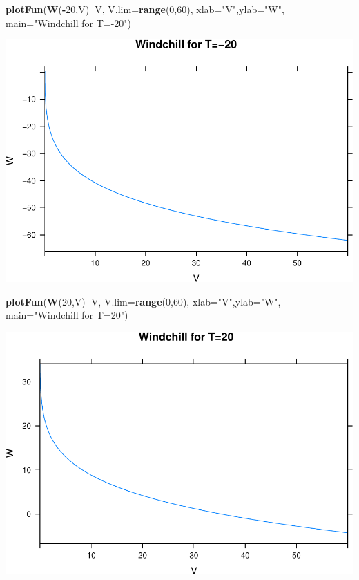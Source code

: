 \documentclass[
]{book}
\newenvironment{Shaded}{\begin{snugshade}}{\end{snugshade}}
\newcommand{\DataTypeTok}[1]{\textcolor[rgb]{0.13,0.29,0.53}{#1}}
\newcommand{\DecValTok}[1]{\textcolor[rgb]{0.00,0.00,0.81}{#1}}
\newcommand{\KeywordTok}[1]{\textcolor[rgb]{0.13,0.29,0.53}{\textbf{#1}}}
\newcommand{\NormalTok}[1]{#1}
\newcommand{\OperatorTok}[1]{\textcolor[rgb]{0.81,0.36,0.00}{\textbf{#1}}}
\newcommand{\StringTok}[1]{\textcolor[rgb]{0.31,0.60,0.02}{#1}}
\begin{document}
\begin{Shaded}
\begin{Highlighting}[]
\KeywordTok{plotFun}\NormalTok{(}\KeywordTok{W}\NormalTok{(}\OperatorTok{-}\DecValTok{20}\NormalTok{,V)}\OperatorTok{~}\NormalTok{V, }\DataTypeTok{V.lim=}\KeywordTok{range}\NormalTok{(}\DecValTok{0}\NormalTok{,}\DecValTok{60}\NormalTok{), }\DataTypeTok{xlab=}\StringTok{"V"}\NormalTok{,}\DataTypeTok{ylab=}\StringTok{"W"}\NormalTok{,  }\DataTypeTok{main=}\StringTok{"Windchill for T=-20"}\NormalTok{)}
\end{Highlighting}
\end{Shaded}

\includegraphics{_bookdown_files/math135_handbook_files/figure-latex/unnamed-chunk-77-1.pdf}

\begin{Shaded}
\begin{Highlighting}[]
\KeywordTok{plotFun}\NormalTok{(}\KeywordTok{W}\NormalTok{(}\DecValTok{20}\NormalTok{,V)}\OperatorTok{~}\NormalTok{V, }\DataTypeTok{V.lim=}\KeywordTok{range}\NormalTok{(}\DecValTok{0}\NormalTok{,}\DecValTok{60}\NormalTok{), }\DataTypeTok{xlab=}\StringTok{"V"}\NormalTok{,}\DataTypeTok{ylab=}\StringTok{"W"}\NormalTok{,  }\DataTypeTok{main=}\StringTok{"Windchill for T=20"}\NormalTok{)}
\end{Highlighting}
\end{Shaded}

\includegraphics{_bookdown_files/math135_handbook_files/figure-latex/unnamed-chunk-77-2.pdf}
\end{document}
